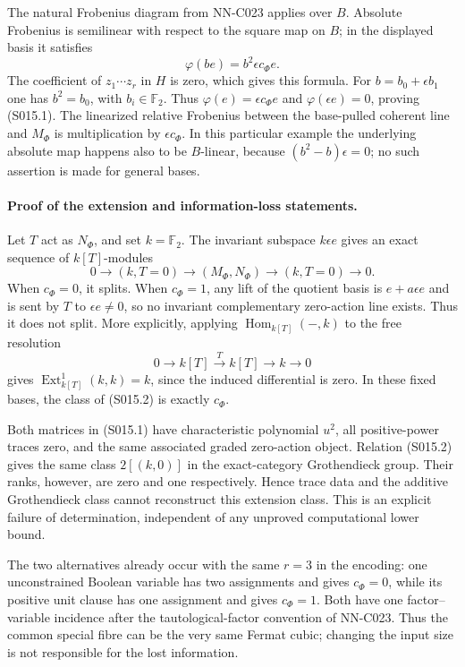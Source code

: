 The natural Frobenius diagram from NN-C023 applies over $B$.
Absolute Frobenius is semilinear with respect to the square map on $B$;
in the displayed basis it satisfies
\[
       \varphi(b e)=b^2\epsilon c_\Phi e.
\]
The coefficient of $z_1\cdots z_r$ in $H$ is zero, which gives
this formula. For $b=b_0+\epsilon b_1$ one has $b^2=b_0$, with
$b_i\in\mathbb F_2$. Thus $\varphi(e)=\epsilon c_\Phi e$ and
$\varphi(\epsilon e)=0$, proving (S015.1). The linearized relative
Frobenius between the base-pulled coherent line and $M_\Phi$ is
multiplication by $\epsilon c_\Phi$. In this particular example the
underlying absolute map happens also to be $B$-linear, because
$(b^2-b)\epsilon=0$; no such assertion is made for general bases.

\paragraph{Proof of the extension and information-loss statements.}
Let $T$ act as $N_\Phi$, and set $k=\mathbb F_2$.
The invariant subspace $k\epsilon e$ gives an exact sequence of
$k[T]$-modules
\[
 0\longrightarrow(k,T=0)\longrightarrow(M_\Phi,N_\Phi)
     \longrightarrow(k,T=0)\longrightarrow0.          \tag{S015.2}
\]
When $c_\Phi=0$, it splits. When $c_\Phi=1$, any lift of the
quotient basis is $e+a\epsilon e$ and is sent by $T$ to
$\epsilon e\ne0$, so no invariant complementary zero-action
line exists. Thus it does not split.
More explicitly, applying $\operatorname{Hom}_{k[T]}(-,k)$ to
the free resolution
\[
 0\longrightarrow k[T]\xrightarrow{T}k[T]
       \longrightarrow k\longrightarrow0
\]
gives $\operatorname{Ext}^1_{k[T]}(k,k)=k$, since the induced
differential is zero. In these fixed bases, the class of
(S015.2) is exactly $c_\Phi$.

Both matrices in (S015.1) have characteristic polynomial $u^2$,
all positive-power traces zero, and the same associated graded
zero-action object. Relation (S015.2) gives the same class
$2[(k,0)]$ in the exact-category Grothendieck group. Their ranks,
however, are zero and one respectively. Hence trace data and the
additive Grothendieck class cannot reconstruct this extension class.
This is an explicit failure of determination, independent of any
unproved computational lower bound.

The two alternatives already occur with the same $r=3$ in the
encoding: one unconstrained Boolean variable has two assignments
and gives $c_\Phi=0$, while its positive unit clause has one assignment
and gives $c_\Phi=1$. Both have one factor--variable incidence after
the tautological-factor convention of NN-C023. Thus the common
special fibre can be the very same Fermat cubic; changing the
input size is not responsible for the lost information.


